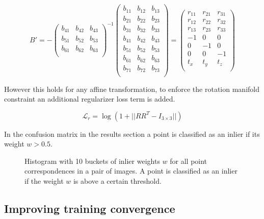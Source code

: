 \[
B'=
-
\begin{pmatrix}
b_{41} & b_{42} & b_{43} \\
b_{51} & b_{52} & b_{53} \\
b_{61} & b_{62} & b_{63} \\
\end{pmatrix}^{-1}
\begin{pmatrix}
b_{11} & b_{12} & b_{13} \\
b_{21} & b_{22} & b_{23} \\
b_{31} & b_{32} & b_{33} \\
b_{41} & b_{42} & b_{43} \\
b_{51} & b_{52} & b_{53} \\
b_{61} & b_{62} & b_{63} \\
b_{71} & b_{72} & b_{73} \\
\end{pmatrix}
=
\begin{pmatrix}
r_{11} & r_{21} & r_{31} \\
r_{12} & r_{22} & r_{32} \\
r_{13} & r_{23} & r_{33} \\
-1 & 0 & 0 \\
0 & -1 & 0 \\
0 & 0 & -1 \\
t_x & t_y & t_z \\
\end{pmatrix}
\]

However this holds for any affine transformation, to enforce the rotation manifold constraint an additional regularizer loss term is added.

\[
\mathcal{L}_r=\log(1 + || RR^T - I_{3\times3} ||)
\]

In the confusion matrix in the results section a point is classified as an inlier if its weight $w>0.5$.


\begin{figure}[H]
	\begin{center}
		
	\end{center}
	\caption{Histogram with 10 buckets of inlier weights $w$ for all point correspondences in a pair of images. A point is classified as an inlier if the weight $w$ is above a certain threshold.}
\end{figure}

\subsection{Improving training convergence}

